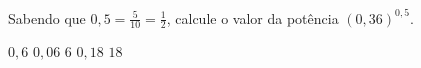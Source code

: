 Sabendo que $0{,}5=\frac{5}{10}=\frac{1}{2}$, calcule o valor da potência $(0{,}36)^{0{,}5}$.

$0{,}6$
$0{,}06$
$6$
$0{,}18$
$18$


